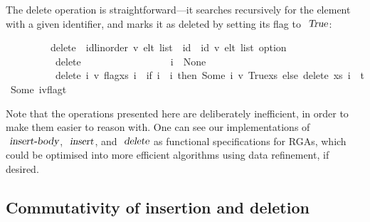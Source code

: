 The delete operation is straightforward---it searches recursively for the element with a given identifier, and marks it as deleted by setting its flag to $\isa{True}$:
\vspace{0.35em}
\begin{isabellebody}
\ \ \ \ \ \ \ \ \ delete\ {\isacharcolon}{\isacharcolon}\ {\isachardoublequoteopen}{\isacharparenleft}{\isacharprime}id{\isacharcolon}{\isacharcolon}{\isacharbraceleft}linorder{\isacharbraceright}{\isacharcomma}\ {\isacharprime}v{\isacharparenright}\ elt\ list\ {\isasymRightarrow}\ {\isacharprime}id\ {\isasymRightarrow}\ {\isacharparenleft}{\isacharprime}id{\isacharcomma}\ {\isacharprime}v{\isacharparenright}\ elt\ list\ option{\isachardoublequoteclose}\ \isanewline
\ \ \ \ \ \ \ \ \ \ {\isachardoublequoteopen}delete\ {\isacharbrackleft}{\isacharbrackright}\ \ \ \ \ \ \ \ \ \ \ \ \ \ \ \ \ i\ {\isacharequal}\ None{\isachardoublequoteclose}\ {\isacharbar}\isanewline
\ \ \ \ \ \ \ \ \ \ {\isachardoublequoteopen}delete\ {\isacharparenleft}{\isacharparenleft}i{\isacharprime}{\isacharcomma}\ v{\isacharcomma}\ flag{\isacharparenright}{\isacharhash}xs{\isacharparenright}\ i\ {\isacharequal}\ {\isacharparenleft}if\ i{\isacharprime}\ {\isacharequal}\ i\ then\ Some\ {\isacharparenleft}{\isacharparenleft}i{\isacharprime}{\isacharcomma}\ v{\isacharcomma}\ True{\isacharparenright}{\isacharhash}xs{\isacharparenright}\ else\ delete\ xs\ i\ {\isasymbind}\ {\isacharparenleft}{\isasymlambda}t{\isachardot}\ Some\ {\isacharparenleft}{\isacharparenleft}i{\isacharprime}{\isacharcomma}v{\isacharcomma}flag{\isacharparenright}{\isacharhash}t{\isacharparenright}{\isacharparenright}{\isacharparenright}{\isachardoublequoteclose}%
\end{isabellebody}
\vspace{0.35em}
Note that the operations presented here are deliberately inefficient, in order to make them easier to reason with.
One can see our implementations of $\isa{insert-body}$, $\isa{insert}$, and $\isa{delete}$ as functional specifications for RGAs, which could be optimised into more efficient algorithms using data refinement, if desired.

\subsection{Commutativity of insertion and deletion}


